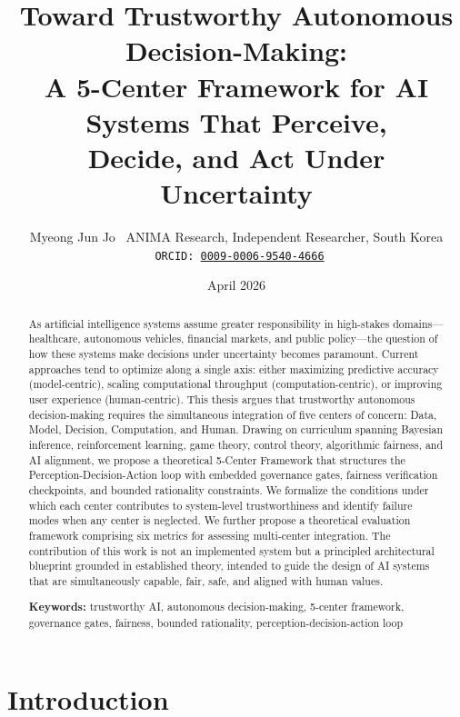 \documentclass[11pt,a4paper]{article}
\title{%
  \textbf{Toward Trustworthy Autonomous Decision-Making:\\
  A 5-Center Framework for AI Systems That Perceive,\\
  Decide, and Act Under Uncertainty}
}
\author{%
  Myeong Jun Jo \
  ANIMA Research, Independent Researcher, South Korea \
  \texttt{ORCID: \href{https://orcid.org/0009-0006-9540-4666}{0009-0006-9540-4666}}
}
\date{April 2026}
\begin{document}
\maketitle

\begin{abstract}
As artificial intelligence systems assume greater responsibility in high-stakes domains---healthcare, autonomous vehicles, financial markets, and public policy---the question of how these systems make decisions under uncertainty becomes paramount. Current approaches tend to optimize along a single axis: either maximizing predictive accuracy (model-centric), scaling computational throughput (computation-centric), or improving user experience (human-centric). This thesis argues that trustworthy autonomous decision-making requires the simultaneous integration of five centers of concern: Data, Model, Decision, Computation, and Human. Drawing on curriculum spanning Bayesian inference, reinforcement learning, game theory, control theory, algorithmic fairness, and AI alignment, we propose a theoretical 5-Center Framework that structures the Perception-Decision-Action loop with embedded governance gates, fairness verification checkpoints, and bounded rationality constraints. We formalize the conditions under which each center contributes to system-level trustworthiness and identify failure modes when any center is neglected. We further propose a theoretical evaluation framework comprising six metrics for assessing multi-center integration. The contribution of this work is not an implemented system but a principled architectural blueprint grounded in established theory, intended to guide the design of AI systems that are simultaneously capable, fair, safe, and aligned with human values.

\vspace{6pt}
\noindent\textbf{Keywords:} trustworthy AI, autonomous decision-making, 5-center framework, governance gates, fairness, bounded rationality, perception-decision-action loop
\end{abstract}

\section{Introduction}
\end{document}
